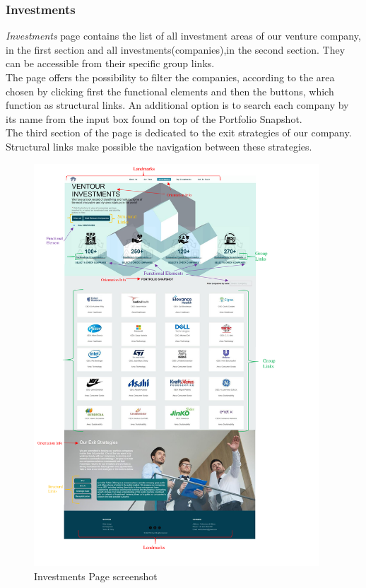\documentclass[../../DD.tex]{subfiles}
\begin{document}
\newpage
	\subsubsection{Investments}
		\textit{Investments} page contains the list of all investment areas of our venture company, in the first section and all investments(companies),in the second section. They can be accessible from their specific group links.\\
  The page offers the possibility to filter the companies, according to the area chosen by clicking first the functional elements and then the buttons, which function as structural links. An additional option is to search each company by its name from the input box found on top of the Portfolio Snapshot.\\
  The third section of the page is dedicated to the exit strategies of our company. Structural links make possible the navigation between these strategies. 
  \begin{figure}[!htb]
      \centering
      \includegraphics[width=0.95\textwidth]{Images/screenshots/investments scr.png}
      \caption{Investments Page screenshot}
      \label{fig:investments-screenshot}
  \end{figure}
\end{document}

